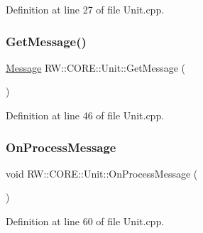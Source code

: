 Definition at line 27 of file Unit.\+cpp.

\hypertarget{class_r_w_1_1_c_o_r_e_1_1_unit_a0bd62b49be93e3e162ba08ac1c02c027}{}\label{class_r_w_1_1_c_o_r_e_1_1_unit_a0bd62b49be93e3e162ba08ac1c02c027} 
\subsubsection{\texorpdfstring{Get\+Message()}{GetMessage()}}
{\footnotesize\ttfamily \hyperlink{namespace_r_w_1_1_c_o_r_e_a571834b44d0e3fab58aa6abfe5a02988}{Message} R\+W\+::\+C\+O\+R\+E\+::\+Unit\+::\+Get\+Message (\begin{DoxyParamCaption}{ }\end{DoxyParamCaption})\hspace{0.3cm}{\ttfamily [private]}}



Definition at line 46 of file Unit.\+cpp.

\hypertarget{class_r_w_1_1_c_o_r_e_1_1_unit_ac614ffc786f0c88a3397563414f8914a}{}\label{class_r_w_1_1_c_o_r_e_1_1_unit_ac614ffc786f0c88a3397563414f8914a} 
\subsubsection{\texorpdfstring{On\+Process\+Message}{OnProcessMessage}}
{\footnotesize\ttfamily void R\+W\+::\+C\+O\+R\+E\+::\+Unit\+::\+On\+Process\+Message (\begin{DoxyParamCaption}{ }\end{DoxyParamCaption})\hspace{0.3cm}{\ttfamily [slot]}}



Definition at line 60 of file Unit.\+cpp.

\hypertarget{class_r_w_1_1_c_o_r_e_1_1_unit_afe8b61eae2147c5ed409f16f801947a8}{}\label{class_r_w_1_1_c_o_r_e_1_1_unit_afe8b61eae2147c5ed409f16f801947a8} 
